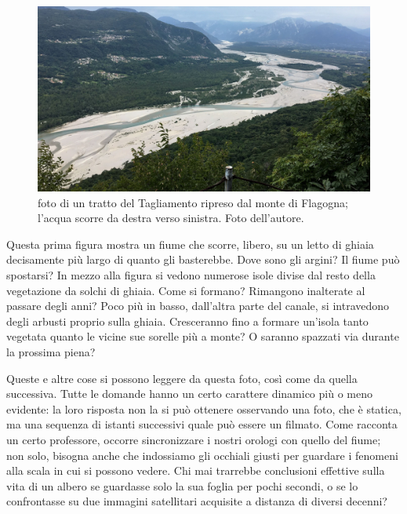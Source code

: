 

\begin{figure}[h]
	\centering
	\includegraphics[width=\textwidth]{files/foto_flagogna.jpg}
	\caption[foto di un tratto del Tagliamento ripreso dal monte di Flagogna]{foto di un tratto del Tagliamento ripreso dal monte di Flagogna; l'acqua scorre da destra verso sinistra. Foto dell'autore.
	}
	\label{fig:foto-flagogna}
\end{figure}



Questa prima figura mostra un fiume che scorre, libero, su un letto di ghiaia decisamente più largo di quanto gli basterebbe. 
Dove sono gli argini? Il fiume può spostarsi? 
%
In mezzo alla figura si vedono numerose isole divise dal resto della vegetazione da solchi di ghiaia. 
Come si formano? Rimangono inalterate al passare degli anni? 
%
Poco più in basso, dall'altra parte del canale, si intravedono degli arbusti proprio sulla ghiaia. 
Cresceranno fino a formare un'isola tanto vegetata quanto le vicine sue sorelle più a monte? O saranno spazzati via durante la prossima piena?

\medskip
Queste e altre cose si possono leggere da questa foto, così come da quella successiva. Tutte le domande hanno un certo carattere dinamico più o meno evidente: la loro risposta non la si può ottenere osservando una foto, che è statica, ma una sequenza di istanti successivi quale può essere un filmato.
Come racconta un certo professore, occorre sincronizzare i nostri orologi con quello del fiume; non solo, bisogna anche che indossiamo gli occhiali giusti per guardare i fenomeni alla scala in cui si possono vedere. Chi mai trarrebbe conclusioni effettive sulla vita di un albero se guardasse solo la sua foglia per pochi secondi, o se lo confrontasse su due immagini satellitari acquisite a distanza di diversi decenni?

